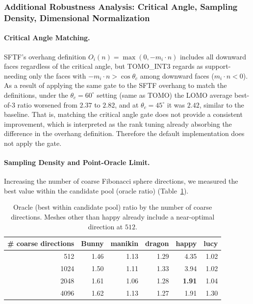 \documentclass[11pt,a4paper]{article}
\begin{document}
\subsubsection{Additional Robustness Analysis: Critical Angle, Sampling Density, Dimensional Normalization}
\label{sec:robustness}

\paragraph{Critical Angle Matching.}
SFTF's overhang definition $O_i(n)=\max(0,-m_i\cdot n)$ includes all downward faces regardless of the critical angle, but
TOMO\_INT3 regards as support-needing only the faces with $-m_i\cdot n>\cos\theta_c$ among downward faces ($m_i\cdot n<0$).
As a result of applying the same gate to the SFTF overhang to match the definitions,
under the $\theta_c=60^\circ$ setting (same as TOMO) the LOMO average best-of-3 ratio
worsened from $2.37$ to $2.82$, and at $\theta_c=45^\circ$ it was $2.42$, similar to the baseline.
That is, matching the critical angle gate does not provide a consistent improvement,
which is interpreted as the rank tuning already absorbing the difference in the overhang definition.
Therefore the default implementation does not apply the gate.

\paragraph{Sampling Density and Point-Oracle Limit.}
Increasing the number of coarse Fibonacci sphere directions, we measured the best value within the candidate pool (oracle ratio) (Table~\ref{tab:sampling}).

\begin{table}[H]
\centering
\caption{Oracle (best within candidate pool) ratio by the number of coarse directions. Meshes other than happy
already include a near-optimal direction at $512$.}
\label{tab:sampling}
\begin{tabular}{rrrrrr}
\toprule
\# coarse directions & Bunny & manikin & dragon & happy & lucy\\
\midrule
512  & 1.46 & 1.13 & 1.29 & 4.35 & 1.02\\
1024 & 1.50 & 1.11 & 1.33 & 3.94 & 1.02\\
2048 & 1.61 & 1.06 & 1.28 & \textbf{1.91} & 1.04\\
4096 & 1.62 & 1.13 & 1.27 & 1.91 & 1.30\\
\bottomrule
\end{tabular}
\end{table}
\end{document}
